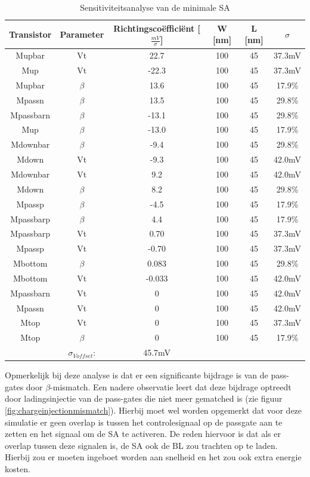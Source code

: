 \begin{table}
\begin{tabular}{cccccc}
\hline 
Transistor & Parameter & Richtingscoëfficiënt [$\frac{mV}{\sigma}$] & W [nm] & L [nm] & $\sigma$ \\ 
\hline 
Mupbar & Vt & 22.7 & 100 & 45 & 37.3mV \\ 
Mup & Vt & -22.3 & 100 & 45 & 37.3mV \\ 
Mupbar & $\beta$ & 13.6 & 100 & 45 & 17.9\% \\ 
Mpassn & $\beta$ & 13.5 & 100 & 45 & 29.8\% \\ 
Mpassbarn & $\beta$ & -13.1 & 100 & 45 & 29.8\% \\ 
Mup & $\beta$ & -13.0 & 100 & 45 & 17.9\% \\ 
Mdownbar & $\beta$ & -9.4 & 100 & 45 & 29.8\% \\ 
Mdown & Vt & -9.3 & 100 & 45 & 42.0mV \\ 
Mdownbar & Vt & 9.2 & 100 & 45 & 42.0mV \\ 
Mdown & $\beta$ & 8.2 & 100 & 45 & 29.8\% \\ 
Mpassp & $\beta$ & -4.5 & 100 & 45 & 17.9\% \\ 
Mpassbarp & $\beta$ & 4.4 & 100 & 45 & 17.9\% \\ 
Mpassbarp & Vt & 0.70 & 100 & 45 & 37.3mV \\ 
Mpassp & Vt & -0.70 & 100 & 45 & 37.3mV \\ 
Mbottom & $\beta$ & 0.083 & 100 & 45 & 29.8\% \\ 
Mbottom & Vt & -0.033 & 100 & 45 & 42.0mV \\ 
Mpassbarn & Vt & 0 & 100 & 45 & 42.0mV \\
Mpassn & Vt & 0 & 100 & 45 & 42.0mV \\
Mtop & Vt & 0 & 100 & 45 & 37.3mV \\
Mtop & $\beta$ & 0 & 100 & 45 & 17.9\% \\
\hline 
\hline & $\sigma_{Voffset}$: & 45.7mV & & & \\
\hline
\end{tabular} 
\caption[Sensitiviteitsanalyse van de minimale SA]{Sensitiviteitsanalyse van de minimale SA}
\label{tab:min-sensanalysis}
\end{table}

Opmerkelijk bij deze analyse is dat er een significante bijdrage is van de pass-gates door $\beta$-mismatch. Een nadere observatie leert dat deze bijdrage optreedt door ladingsinjectie van de pass-gates die niet meer gematched is (zie figuur \ref{fig:chargeinjectionmismatch}).
Hierbij moet wel worden opgemerkt dat voor deze simulatie er geen overlap is tussen het controlesignaal op de passgate aan te zetten en het signaal om de SA te activeren.
De reden hiervoor is dat als er overlap tussen deze signalen is, de SA ook de BL zou trachten op te laden. Hierbij zou er moeten ingeboet worden aan snelheid en het zou ook extra energie kosten.

